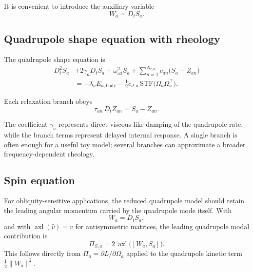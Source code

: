 \documentclass[journal, a4paper]{IEEEtran}
\begin{document}
It is convenient to introduce the auxiliary variable
\begin{equation}
W_a = D_t S_a.
\label{eq:Wdef}
\end{equation}

\subsection{Quadrupole shape equation with rheology}

The quadrupole shape equation is
\begin{align}
D_t^2 S_a
&+
2\gamma_a D_t S_a
+
\omega_{a2}^2 S_a
+
\sum_{n=1}^{N_{\mathrm{r},a}}
c_{an}
\bigl(S_a-Z_{an}\bigr)
\nonumber\\
&=
- \lambda_a E_{a,\mathrm{body}}
-
\frac{1}{2}\tilde c_{J,a}
\,\mathrm{STF}
\bigl(
\Omega_a\Omega_a^\top
\bigr).
\label{eq:Seq}
\end{align}

Each relaxation branch obeys
\begin{equation}
\tau_{an}\,D_t Z_{an} = S_a - Z_{an}.
\label{eq:Zquad}
\end{equation}

The coefficient $\gamma_a$ represents direct viscous-like damping of the
quadrupole rate, while the branch terms represent delayed internal response.
A single branch is often enough for a useful toy model; several branches can
approximate a broader frequency-dependent rheology.

\subsection{Spin equation}

For obliquity-sensitive applications, the reduced quadrupole model should
retain the leading angular momentum carried by the quadrupole mode itself.
With
\begin{equation}
W_a=D_tS_a,
\label{eq:Wdefrepeat}
\end{equation}
and with $\operatorname{axl}(\widehat v)=v$ for antisymmetric matrices, the
leading quadrupole modal contribution is
\begin{equation}
\Pi_{S,a}
=
2\,\operatorname{axl}\!\bigl([W_a,S_a]\bigr).
\label{eq:Pimodequad}
\end{equation}
This follows directly from $\Pi_a=\partial L/\partial\Omega_a$ applied to the
quadrupole kinetic term $\tfrac12\|W_a\|^2$.
\end{document}
